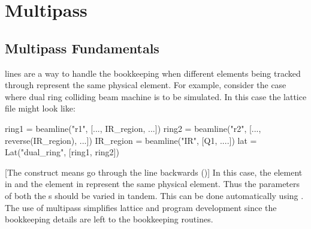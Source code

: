 \chapter{Multipass}
\label{s:multipass}

\section{Multipass Fundamentals}
\label{s:multipass.fund}

 lines are a way to handle the bookkeeping when different elements being tracked
through represent the same physical element. For example, consider the case where dual ring colliding
beam machine is to be simulated. In this case the lattice file might look like:
\begin{example}
  ring1 = beamline("r1", [..., IR_region, ...])
  ring2 = beamline("r2", [..., reverse(IR_region), ...])
  IR_region = beamline("IR", [Q1, ....])
  lat = Lat("dual_ring", [ring1, ring2])
\end{example}
[The  construct means go through the line backwards ()] 
In this case, the  element in  and the
 element in  represent the same physical element.
Thus the parameters
of both the s should be varied in tandem. This can be done automatically using .
The use of multipass simplifies lattice and program development since the bookkeeping details are left
to the \accellat bookkeeping routines.

